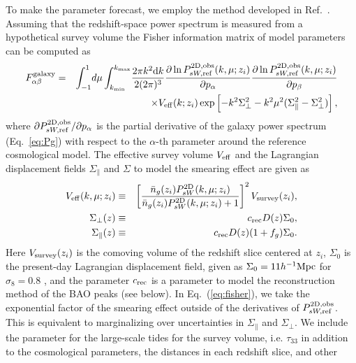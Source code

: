\documentclass[prd,onecolumn,notitlepage,amsmath,amssymb,floatfix,superscriptaddress]{revtex4-1}
\begin{document}
To make the parameter forecast,
we employ the method developed in
Ref.~\cite{SeoEisenstein:07,Takadaetal:14,TakadaDore:15}. 
Assuming that the redshift-space power spectrum is measured from a hypothetical survey volume
the Fisher information matrix of model parameters can be computed as
%
\begin{eqnarray}
F^{\rm galaxy}_{\alpha\beta}&=&\int_{-1}^1\!d\mu\int^{k_{\rm max}}_{k_{\rm
 min}}\!\frac{2\pi k^2\mathrm{d}k}{2(2\pi)^3}
\frac{\partial \ln P^{\rm 2D, obs}_{sW, {\rm ref}}(k,\mu; z_i)}{\partial
 p_\alpha}
\frac{\partial \ln P^{\rm 2D, obs}_{sW, {\rm ref}}(k,\mu; z_i)}{\partial
 p_\beta}
\nonumber\\
&&\hspace{2em}
\times V_{\rm eff}(k; z_i)
\exp\left[-k^2\Sigma_\perp^2 -k^2\mu^2(\Sigma_\parallel^2-\Sigma_\perp^2)\right],
\label{eq:fisher}
\end{eqnarray}
%
where $\partial P^{\rm 2D, obs}_{sW,{\rm ref}}/\partial p_\alpha$ is the
partial derivative of the galaxy power spectrum (Eq.~\ref{eq:Pg}) with
respect to the $\alpha$-th parameter around the reference cosmological
model. The effective survey volume $V_{\rm eff}$ 
and the Lagrangian
displacement fields $\Sigma_\parallel$ and $\Sigma$ to model the
smearing effect are given
as
%
\begin{eqnarray}
V_{\rm eff}(k,\mu;z_i)&\equiv&
 \left[\frac{\bar{n}_g(z_i)P^{\rm 2D}_{sW}(k,\mu;z_i)}
{\bar{n}_g(z_i)P^{\rm 2D}_{sW}(k,\mu; z_i)+1}\right]^2V_{\rm
 survey}(z_i),\\
\Sigma_{\perp}(z)&\equiv & c_{\rm rec}D(z)\Sigma_0, \\
\Sigma_{\parallel}(z)&\equiv & c_{\rm rec}D(z)(1+f_g)\Sigma_0.
\label{eq:sigma}
\end{eqnarray}
%
Here $V_{\rm survey}(z_i)$ is the comoving volume of the redshift slice
centered at $z_i$, $\Sigma_0$ is 
the present-day Lagrangian displacement field, given as
$\Sigma_0=11h^{-1}{\rm Mpc}$ for $\sigma_8=0.8$ \cite{Eisensteinetal:07}, 
and the parameter
$c_{\rm rec}$ is a parameter to model the reconstruction method of the
BAO peaks (see below). 
In
Eq.~(\ref{eq:fisher}), we take the exponential factor of the smearing
effect outside of the derivatives of $P^{\rm 2D, obs}_{sW,{\rm ref}}$. This is equivalent
to marginalizing over uncertainties in $\Sigma_\parallel$ and
$\Sigma_\perp$.
We include the parameter for the large-scale tides for the survey volume, 
i.e. 
$\tau_{33}$ in addition to 
the cosmological parameters, the distances in each redshift slice, and other
\end{document}
